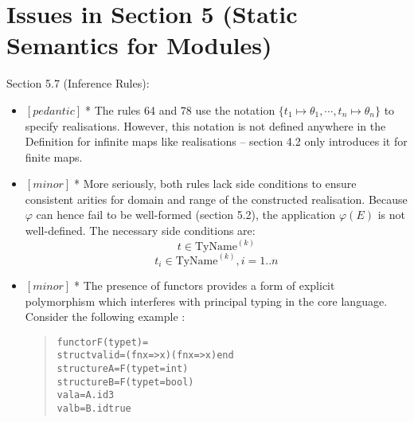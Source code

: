 \documentclass{article}
\newcommand{\m}[1]{$[\mathit{#1}]\;$}
\newcommand{\minor}{\m{minor}}
\newcommand{\pedantic}{\m{pedantic}}
\begin{document}
\section{Issues in Section 5 (Static Semantics for Modules)}
\label{bugschapter5}

Section 5.7 (Inference Rules):
\nopagebreak

\begin{itemize}
\item \pedantic * The rules 64 and 78 use the notation $\{t_1\mapsto\theta_1,\cdots,t_n\mapsto\theta_n\}$ to specify realisations. However, this notation is not defined anywhere in the Definition for infinite maps like realisations -- section 4.2 only introduces it for finite maps.

\item \minor * More seriously, both rules lack side conditions to ensure consistent arities for domain and range of the constructed realisation. Because $\varphi$ can hence fail to be well-formed (section 5.2), the application $\varphi(E)$ is not well-defined. The necessary side conditions are:
\setcounter{equation}{63}
\begin{equation}
t \in \mbox{TyName}^{(k)}
\end{equation}
\setcounter{equation}{77}
\begin{equation}
t_i \in \mbox{TyName}^{(k)}, i = 1..n
\end{equation}

\item \minor * The presence of functors provides a form of explicit polymorphism which interferes with principal typing in the core language. Consider the following example \cite{prinicipalmodules}:

\begin{quote}
\begin{alltt}
functor F(type t) =
    struct val id = (fn x => x) (fn x => x) end
structure A = F(type t = int)
structure B = F(type t = bool)
val a = A.id 3
val b = B.id true
\end{alltt}
\end{quote}


\end{itemize}
\end{document}

